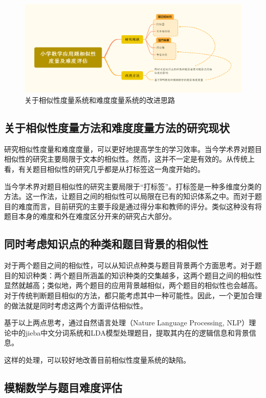 \begin{figure}[h]
    \centering
    \includegraphics[scale=0.22]{res/figure042227.png}
    \caption{关于相似性度量系统和难度度量系统的改进思路}
\end{figure}
 
\subsection{关于相似性度量方法和难度度量方法的研究现状}

研究相似性度量和难度度量，可以更好地提高学生的学习效率。当今学术界对题目相似性的研究主要局限于文本的相似性。然而，这并不一定是有效的。从传统上看，有关题目相似性的研究几乎都是从打标签这一角度开始的\cite{xuTimunandupinggufangfayanjiuzongshu2022}。

当今学术界对题目相似性的研究主要局限于“打标签”。打标签是一种多维度分类的方法。这一作法，让题目之间的相似性可以局限在已有的知识体系之中。而对于题目的难度而言，目前研究的主要手段是通过得分率和教师的评分。类似这种没有将题目本身的难度和外在难度区分开来的研究占大部分。

\subsection{同时考虑知识点的种类和题目背景的相似性}

对于两个题目之间的相似性，可以从知识点种类与题目背景两个方面思考。对于题目的知识种类：两个题目所涵盖的知识种类的交集越多，这两个题目之间的相似性显然就越高；类似地，两个题目的应用背景越相似，两个题目的相似性也会越高。对于传统判断题目相似的方法，都只能考虑其中一种可能性。因此，一个更加合理的做法就是同时考虑这两个方面评估相似性。

基于以上两点思考，通过自然语言处理（Nature Language Processing, NLP）理论中的jieba中文分词系统和LDA模型处理题目，提取其内在的逻辑信息和背景信息。

这样的处理，可以较好地改善目前相似性度量系统的缺陷。

\subsection{模糊数学与题目难度评估}

